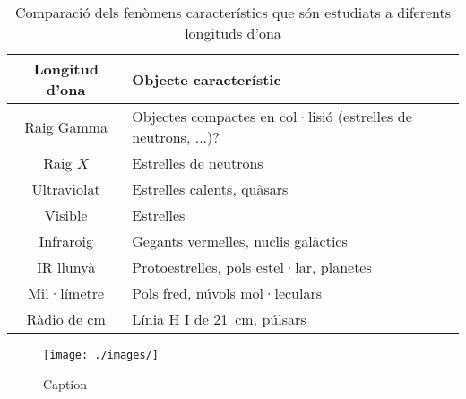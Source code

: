 \begin{table}[H]
	\centering
	\begin{tabularx}{0.9\textwidth}{cX}
		\toprule
		Longitud d'ona & Objecte característic \\
		\midrule
		Raig Gamma & Objectes compactes en col·lisió (estrelles de neutrons, ...)? \\
		Raig $X$ & Estrelles de neutrons \\
		Ultraviolat & Estrelles calents, quàsars \\
		Visible & Estrelles \\
		Infraroig & Gegants vermelles, nuclis galàctics \\
		IR llunyà & Protoestrelles, pols estel·lar, planetes \\
		Mil·límetre & Pols fred, núvols mol·leculars \\
		Ràdio de \si{\cm} & Línia H I de \SI{21}{\cm}, púlsars \\
		\bottomrule
	\end{tabularx}
	\caption{Comparació dels fenòmens característics que són estudiats a diferents longituds d'ona}
	\label{tab:wavelenghts}
\end{table}

\begin{figure}[h]
	\centering
	\texttt{[image: ./images/]}
	\caption{Caption}
	\label{fig:}
\end{figure}

